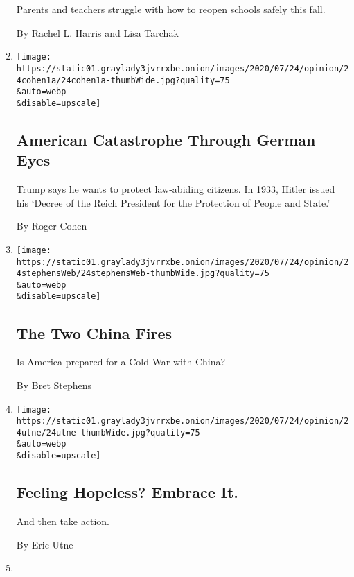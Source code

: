 \begin{enumerate}
  Parents and teachers struggle with how to reopen schools safely this
  fall.

  By Rachel L. Harris and Lisa Tarchak
\item
  \href{/2020/07/24/opinion/trump-germany.html}{}

  \texttt{[image: https://static01.graylady3jvrrxbe.onion/images/2020/07/24/opinion/24cohen1a/24cohen1a-thumbWide.jpg?quality=75\\\&auto=webp\\\&disable=upscale]}

  \hypertarget{american-catastrophe-through-german-eyes}{%
  \subsection{American Catastrophe Through German
  Eyes}\label{american-catastrophe-through-german-eyes}}

  Trump says he wants to protect law-abiding citizens. In 1933, Hitler
  issued his `Decree of the Reich President for the Protection of People
  and State.'

  By Roger Cohen
\item
  \href{/2020/07/24/opinion/china-trump.html}{}

  \texttt{[image: https://static01.graylady3jvrrxbe.onion/images/2020/07/24/opinion/24stephensWeb/24stephensWeb-thumbWide.jpg?quality=75\\\&auto=webp\\\&disable=upscale]}

  \hypertarget{the-two-china-fires}{%
  \subsection{The Two China Fires}\label{the-two-china-fires}}

  Is America prepared for a Cold War with China?

  By Bret Stephens
\item
  \href{/2020/07/24/opinion/hopeless-covid-climate.html}{}

  \texttt{[image: https://static01.graylady3jvrrxbe.onion/images/2020/07/24/opinion/24utne/24utne-thumbWide.jpg?quality=75\\\&auto=webp\\\&disable=upscale]}

  \hypertarget{feeling-hopeless-embrace-it}{%
  \subsection{Feeling Hopeless? Embrace
  It.}\label{feeling-hopeless-embrace-it}}

  And then take action.

  By Eric Utne
\item
  \href{/2020/07/24/opinion/trump-test-people-woman-man-camera-tv.html}{}


\end{enumerate}
